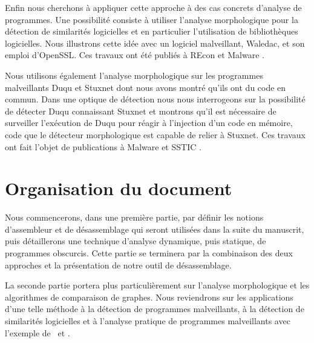 Enfin nous cherchons à appliquer cette approche à des cas concrets d'analyse de programmes.
Une possibilité consiste à utiliser l'analyse morphologique pour la détection de similarités logicielles et en particulier l'utilisation de bibliothèques logicielles.
Nous illustrons cette idée avec un logiciel malveillant, Waledac, et son emploi d'OpenSSL.
Ces travaux ont été publiés à REcon \cite{REAT12} et Malware \cite{mal12}.

Nous utilisons également l'analyse morphologique sur les programmes malveillants Duqu et Stuxnet dont nous avons montré qu'ils ont du code en commun.
Dans une optique de détection nous nous interrogeons sur la possibilité de détecter Duqu connaissant Stuxnet et montrons qu'il est nécessaire de surveiller l'exécution de Duqu pour réagir à l'injection d'un code en mémoire, code que le détecteur morphologique est capable de relier à Stuxnet.
Ces travaux ont fait l'objet de publications à Malware \cite{mal13} et SSTIC \cite{sstic13}.

\section*{Organisation du document}

Nous commencerons, dans une première partie, par définir les notions d'assembleur et de désassemblage qui seront utilisées dans la suite du manuscrit, puis détaillerons une technique d'analyse dynamique, puis statique, de programmes obscurcis. Cette partie se terminera par la combinaison des deux approches et la présentation de notre outil de désassemblage.

La seconde partie portera plus particulièrement sur l'analyse morphologique et les algorithmes de comparaison de graphes. Nous reviendrons sur les applications d'une telle méthode à la détection de programmes malveillants, à la détection de similarités logicielles et à l'analyse pratique de programmes malveillants avec l'exemple de \duqu\ et \stux.
